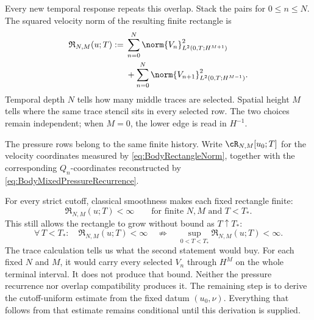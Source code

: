 Every new temporal response repeats this overlap.
Stack the pairs for \(0\leq n\leq N\).
The squared velocity norm of the resulting finite rectangle is
\begin{equation}\label{eq:BodyRectangleNorm}
\begin{aligned}
  \mathfrak R_{N,M}(u;T)
  :={}&
  \sum_{n=0}^{N}
  \norm{V_n}_{L^2(0,T;H^{M+1})}^2
  \\
  &+
  \sum_{n=0}^{N}
  \norm{V_{n+1}}_{L^2(0,T;H^{M-1})}^2.
\end{aligned}
\end{equation}
Temporal depth \(N\) tells how many middle traces are selected.
Spatial height \(M\) tells where the same trace stencil sits in every selected row.
The two choices remain independent; when \(M=0\), the lower edge is read in \(H^{-1}\).

The pressure rows belong to the same finite history.
Write \(\cR_{N,M}[u_0;T]\) for the velocity coordinates measured by
\eqref{eq:BodyRectangleNorm}, together with the corresponding \(Q_n\)-coordinates reconstructed by
\eqref{eq:BodyMixedPressureRecurrence}.

For every strict cutoff, classical smoothness makes each fixed rectangle finite:
\begin{equation}\label{eq:StrictSubintervalRectangleBound}
  \mathfrak R_{N,M}(u;T)<\infty
  \qquad\text{for finite }N,M\text{ and }T<T_*.
\end{equation}
This still allows the rectangle to grow without bound as \(T\uparrow T_*\):
\[
  \forall\,T<T_*:\quad \mathfrak R_{N,M}(u;T)<\infty
  \quad\not\Longrightarrow\quad
  \sup_{0<T<T_*}\mathfrak R_{N,M}(u;T)<\infty.
\]
The trace calculation tells us what the second statement would buy.
For each fixed \(N\) and \(M\), it would carry every selected \(V_n\) through \(H^M\) on the whole terminal interval.
It does not produce that bound.
Neither the pressure recurrence nor overlap compatibility produces it.
The remaining step is to derive the cutoff-uniform estimate from the fixed datum \((u_0,\nu)\).
Everything that follows from that estimate remains conditional until this derivation is supplied.

